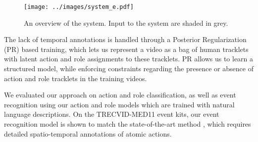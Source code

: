 \documentclass[10pt,twocolumn,letterpaper]{article}
\begin{document}
\begin{figure*} 
  \texttt{[image: ../images/system\_e.pdf]}
  \caption{An overview of the system. Input to the system are shaded in grey.}
\label{fig:system}
\end{figure*}

The lack of temporal annotations is handled through a Posterior Regularization
(PR) \cite{Ganchev_JMLR10} based training, which lets us represent a video as a
bag of human tracklets with latent action and role assignments to these
tracklets. PR allows us to learn a structured model, while enforcing
constraints regarding the presence or absence of action and role tracklets in
the training videos. 

We evaluated our approach on action and role classification,
as well as event recognition using our action and role models
which are trained with natural language descriptions.
On the TRECVID-MED11 event kits,
our event recognition model is shown to match
the state-of-the-art method \cite{Izadinia_ECCV12}, which requires
detailed spatio-temporal annotations of atomic actions.

\end{document}

